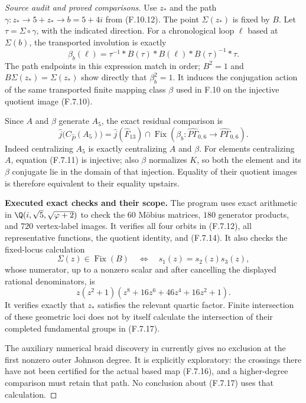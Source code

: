\begin{proof}[Source audit and proved comparisons]
Use $z_*$ and the path
$\gamma:z_*\to5+z_*\to b=5+4i$ from (F.10.12).
The point $\Sigma(z_*)$ is fixed by $B$.  Let
$\tau=\Sigma\circ\gamma$, with the indicated direction.
For a chronological loop $\ell$ based at $\Sigma(b)$, the
transported involution is exactly
\[
 \beta_b(\ell)=
 \tau^{-1}*B(\tau)*B(\ell)*B(\tau)^{-1}*\tau.          \tag{F.7.16}
\]
The path endpoints in this expression match in order;
$B^2=1$ and $B\Sigma(z_*)=\Sigma(z_*)$ show directly that
$\beta_b^2=1$.  It induces the conjugation action of the
same transported finite mapping class $\beta$ used in F.10
on the injective quotient image (F.7.10).

Since $A$ and $\beta$ generate $A_5$, the exact residual
comparison is
\[
 \widehat j\bigl(C_{\widehat P}(A_5)\bigr)
   =\widehat j(\widehat F_{13})\cap
       \operatorname{Fix}\!\left(
          \beta_b:\widehat{P\Gamma}_{0,6}
                    \longrightarrow\widehat{P\Gamma}_{0,6}
                          \right).                    \tag{F.7.17}
\]
Indeed centralizing $A_5$ is exactly centralizing $A$ and
$\beta$.  For elements centralizing $A$, equation (F.7.11)
is injective; also $\beta$ normalizes $K$, so both the
element and its $\beta$ conjugate lie in the domain of
that injection.  Equality of their quotient images is
therefore equivalent to their equality upstairs.

\medskip\noindent\textbf{Executed exact checks and their scope.}
The program 
uses exact arithmetic in $\Q(i,\sqrt5,\sqrt{\varphi+2})$
to check the $60$ M\"obius matrices, $180$ generator
products, and $720$ vertex-label images.  It verifies all
four orbits in (F.7.12), all representative functions,
the quotient identity, and (F.7.14).  It also checks
the fixed-locus calculation
\[
 \Sigma(z)\in\operatorname{Fix}(B)
 \quad\Longleftrightarrow\quad s_1(z)=s_2(z)s_3(z),
\]
whose numerator, up to a nonzero scalar and after
cancelling the displayed rational denominators, is
\[
 z(z^2+1)(z^8+16z^6+46z^4+16z^2+1).                    \tag{F.7.18}
\]
It verifies exactly that $z_*$ satisfies the relevant
quartic factor.  Finite intersection of these geometric
loci does not by itself calculate the intersection of
their completed fundamental groups in (F.7.17).

The auxiliary numerical braid discovery in
 currently gives
no exclusion at the first nonzero outer Johnson degree.
It is explicitly exploratory: the crossings there have
not been certified for the actual based map (F.7.16),
and a higher-degree comparison must retain that path.
No conclusion about (F.7.17) uses that calculation.


\end{proof}
